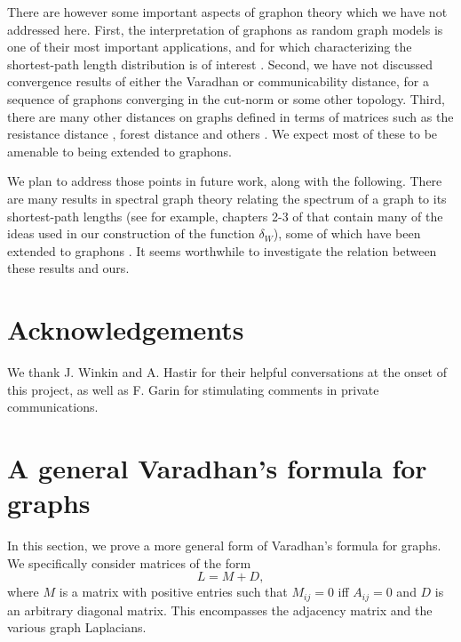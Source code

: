 \documentclass[11pt]{article}
\theoremstyle{definition}
\begin{document}
There are however some important aspects of graphon theory which we have not addressed here. First, the interpretation of graphons as random graph models is one of their most important applications, and for which characterizing the shortest-path length distribution is of interest \cite{loombaGeodesicLengthDistribution2025}. Second, we have not discussed convergence results of either the Varadhan or communicability distance, for a sequence of graphons converging in the cut-norm or some other topology. Third, there are many other distances on graphs defined in terms of matrices such as the resistance distance \cite{kleinResistanceDistance1993}, forest distance \cite{chebotarevForestMetricsGraph2002} and others \cite{chebotarevClassGraphgeodeticDistances2011,chebotarevWalkDistancesGraphs2012}. We expect most of these to be amenable to being extended to graphons.

We plan to address those points in future work, along with the following. There are many results in spectral graph theory relating the spectrum of a graph to its shortest-path lengths (see for example, chapters 2-3 of \cite{chungSpectralGraphTheory1997} that contain many of the ideas used in our construction of the function $\delta_W$), some of which have been extended to graphons \cite{khetanCheegerInequalitiesGraph2024}. It seems worthwhile to investigate the relation between these results and ours.

\section*{Acknowledgements}

We thank J. Winkin and A. Hastir for their helpful conversations at the onset of this project, as well as F. Garin for stimulating comments in private communications.


\newpage
\appendix

\section{A general Varadhan's formula for graphs} \label{sec:general-varadhan}

In this section, we prove a more general form of Varadhan's formula for graphs. We specifically consider matrices of the form
$$ L = M + D, $$
where $M$ is a matrix with positive entries such that $M_{ij}=0$ iff $A_{ij}=0$ and $D$ is an arbitrary diagonal matrix. This encompasses the adjacency matrix and the various graph Laplacians. 
\end{document}
